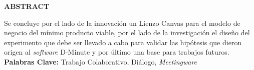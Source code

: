 \begin{center}
\textbf{ABSTRACT}
\end{center}


Se concluye por el lado de la innovación un Lienzo Canvas para el modelo de negocio del mínimo producto viable, por el lado de la investigación el diseño del experimento que debe ser llevado a cabo para validar las hipótesis que dieron origen al \textit{software} D-Minute y por último una base para trabajos futuros.\newline 
\newline\textbf{Palabras Clave:} Trabajo Colaborativo, Diálogo, \textit{Meetingware}
